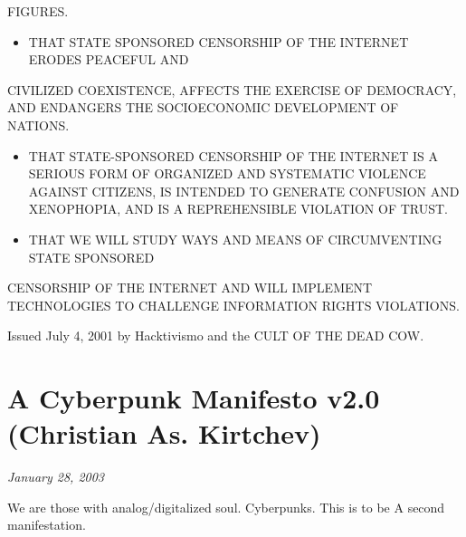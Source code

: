 \documentclass[letterpaper,12pt,english]{sphinxmanual}
\begin{document}
FIGURES.
\begin{itemize}
\item {} 
THAT STATE SPONSORED CENSORSHIP OF THE INTERNET ERODES PEACEFUL AND

\end{itemize}

CIVILIZED COEXISTENCE, AFFECTS THE EXERCISE OF DEMOCRACY, AND ENDANGERS
THE SOCIOECONOMIC DEVELOPMENT OF NATIONS.
\begin{itemize}
\item {} 
THAT STATE-SPONSORED CENSORSHIP OF THE INTERNET IS A SERIOUS FORM OF ORGANIZED AND SYSTEMATIC VIOLENCE AGAINST CITIZENS, IS INTENDED TO GENERATE CONFUSION AND XENOPHOPIA, AND IS A REPREHENSIBLE VIOLATION OF TRUST.

\item {} 
THAT WE WILL STUDY WAYS AND MEANS OF CIRCUMVENTING STATE SPONSORED

\end{itemize}

CENSORSHIP OF THE INTERNET AND WILL IMPLEMENT TECHNOLOGIES TO CHALLENGE
INFORMATION RIGHTS VIOLATIONS.

Issued July 4, 2001 by Hacktivismo and the CULT OF THE DEAD COW.


\chapter{A Cyberpunk Manifesto v2.0 (Christian As. Kirtchev)}
\label{2003:a-cyberpunk-manifesto-v2-0-christian-as-kirtchev}\label{2003::doc}\label{2003:index-0}
\emph{January 28, 2003}

We are those with analog/digitalized soul. Cyberpunks. This is to be A second manifestation.
\end{document}
